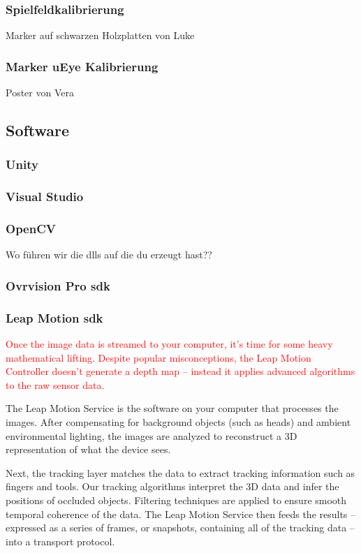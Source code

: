 \subsubsection{Spielfeldkalibrierung}
Marker auf schwarzen Holzplatten von Luke

\subsubsection{Marker uEye Kalibrierung}
Poster von Vera

\subsection{Software}
\subsubsection{Unity \label{unity}} 
\subsubsection{Visual Studio} 
\subsubsection{OpenCV} 
Wo führen wir die dlls auf die du erzeugt hast??
\subsubsection{Ovrvision Pro sdk} 
\subsubsection{Leap Motion sdk} 
\textcolor{red}{
Once the image data is streamed to your computer, it’s time for some heavy mathematical lifting. Despite popular misconceptions, the Leap Motion Controller doesn’t generate a depth map – instead it applies advanced algorithms to the raw sensor data.}

The Leap Motion Service is the software on your computer that processes the images. After compensating for background objects (such as heads) and ambient environmental lighting, the images are analyzed to reconstruct a 3D representation of what the device sees.

Next, the tracking layer matches the data to extract tracking information such as fingers and tools. Our tracking algorithms interpret the 3D data and infer the positions of occluded objects. Filtering techniques are applied to ensure smooth temporal coherence of the data. The Leap Motion Service then feeds the results – expressed as a series of frames, or snapshots, containing all of the tracking data – into a transport protocol.

